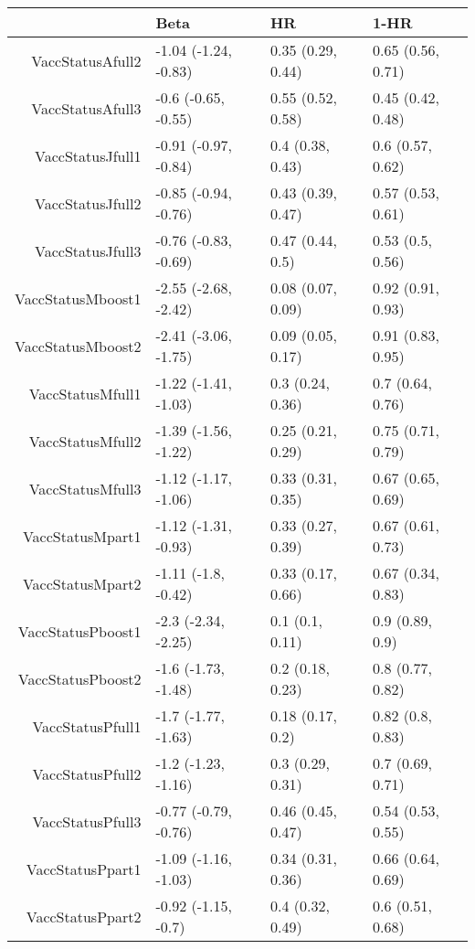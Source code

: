 \begin{table}[ht]
\centering
\begin{tabular}{rlll}
  \hline
 & Beta & HR & 1-HR \\ 
  \hline
VaccStatusAfull2 & -1.04 (-1.24, -0.83) & 0.35 (0.29, 0.44) & 0.65 (0.56, 0.71) \\ 
  VaccStatusAfull3 & -0.6 (-0.65, -0.55) & 0.55 (0.52, 0.58) & 0.45 (0.42, 0.48) \\ 
  VaccStatusJfull1 & -0.91 (-0.97, -0.84) & 0.4 (0.38, 0.43) & 0.6 (0.57, 0.62) \\ 
  VaccStatusJfull2 & -0.85 (-0.94, -0.76) & 0.43 (0.39, 0.47) & 0.57 (0.53, 0.61) \\ 
  VaccStatusJfull3 & -0.76 (-0.83, -0.69) & 0.47 (0.44, 0.5) & 0.53 (0.5, 0.56) \\ 
  VaccStatusMboost1 & -2.55 (-2.68, -2.42) & 0.08 (0.07, 0.09) & 0.92 (0.91, 0.93) \\ 
  VaccStatusMboost2 & -2.41 (-3.06, -1.75) & 0.09 (0.05, 0.17) & 0.91 (0.83, 0.95) \\ 
  VaccStatusMfull1 & -1.22 (-1.41, -1.03) & 0.3 (0.24, 0.36) & 0.7 (0.64, 0.76) \\ 
  VaccStatusMfull2 & -1.39 (-1.56, -1.22) & 0.25 (0.21, 0.29) & 0.75 (0.71, 0.79) \\ 
  VaccStatusMfull3 & -1.12 (-1.17, -1.06) & 0.33 (0.31, 0.35) & 0.67 (0.65, 0.69) \\ 
  VaccStatusMpart1 & -1.12 (-1.31, -0.93) & 0.33 (0.27, 0.39) & 0.67 (0.61, 0.73) \\ 
  VaccStatusMpart2 & -1.11 (-1.8, -0.42) & 0.33 (0.17, 0.66) & 0.67 (0.34, 0.83) \\ 
  VaccStatusPboost1 & -2.3 (-2.34, -2.25) & 0.1 (0.1, 0.11) & 0.9 (0.89, 0.9) \\ 
  VaccStatusPboost2 & -1.6 (-1.73, -1.48) & 0.2 (0.18, 0.23) & 0.8 (0.77, 0.82) \\ 
  VaccStatusPfull1 & -1.7 (-1.77, -1.63) & 0.18 (0.17, 0.2) & 0.82 (0.8, 0.83) \\ 
  VaccStatusPfull2 & -1.2 (-1.23, -1.16) & 0.3 (0.29, 0.31) & 0.7 (0.69, 0.71) \\ 
  VaccStatusPfull3 & -0.77 (-0.79, -0.76) & 0.46 (0.45, 0.47) & 0.54 (0.53, 0.55) \\ 
  VaccStatusPpart1 & -1.09 (-1.16, -1.03) & 0.34 (0.31, 0.36) & 0.66 (0.64, 0.69) \\ 
  VaccStatusPpart2 & -0.92 (-1.15, -0.7) & 0.4 (0.32, 0.49) & 0.6 (0.51, 0.68) \\ 

\end{tabular}
\end{table}
